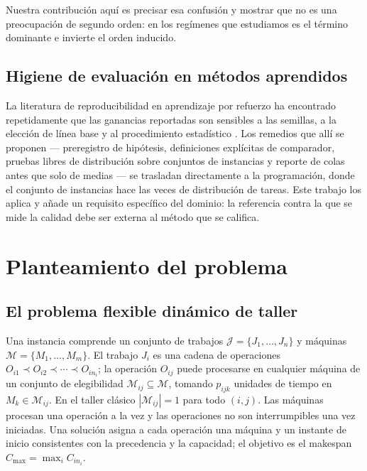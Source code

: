 \documentclass[a4paper,fleqn]{cas-sc}
\newcommand{\Cmax}{C_{\max}}
\begin{document}
Nuestra contribución aquí es precisar esa confusión y mostrar que no es una
preocupación de segundo orden: en los regímenes que estudiamos es el término
dominante e invierte el orden inducido.

\subsection{Higiene de evaluación en métodos aprendidos}

La literatura de reproducibilidad en aprendizaje por refuerzo ha encontrado
repetidamente que las ganancias reportadas son sensibles a las semillas, a la
elección de línea base y al procedimiento estadístico
\citep{henderson2018,agarwal2021}. Los remedios que allí se proponen ---
preregistro de hipótesis, definiciones explícitas de comparador, pruebas libres
de distribución sobre conjuntos de instancias y reporte de colas antes que solo
de medias \citep{demsar2006,garcia2008,munafo2017,kerr1998} --- se trasladan
directamente a la programación, donde el conjunto de instancias hace las veces
de distribución de tareas. Este trabajo los aplica y añade un requisito
específico del dominio: la referencia contra la que se mide la calidad debe ser
externa al método que se califica.

\section{Planteamiento del problema}\label{sec:problem}

\subsection{El problema flexible dinámico de taller}

Una instancia comprende un conjunto de trabajos $\mathcal{J}=\{J_1,\dots,J_n\}$
y máquinas $\mathcal{M}=\{M_1,\dots,M_m\}$. El trabajo $J_i$ es una cadena de
operaciones $O_{i1}\prec O_{i2}\prec\cdots\prec O_{in_i}$; la operación
$O_{ij}$ puede procesarse en cualquier máquina de un conjunto de elegibilidad
$\mathcal{M}_{ij}\subseteq\mathcal{M}$, tomando $p_{ijk}$ unidades de tiempo en
$M_k\in\mathcal{M}_{ij}$. En el taller clásico $|\mathcal{M}_{ij}|=1$ para todo
$(i,j)$. Las máquinas procesan una operación a la vez y las operaciones no son
interrumpibles una vez iniciadas. Una solución asigna a cada operación una
máquina y un instante de inicio consistentes con la precedencia y la capacidad;
el objetivo es el makespan $\Cmax=\max_{i}C_{i n_i}$.
\end{document}
